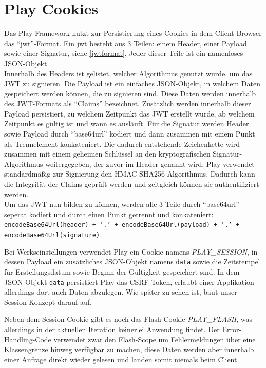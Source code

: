 \documentclass[12pt,DIV14,BCOR10mm,a4paper,parskip=half-,headsepline,headinclude,english,ngerman,bibliography=totocnumbered]{scrreprt}
\begin{document}
\section{Play Cookies}
\label{play:cookies}
Das Play Framework nutzt zur Persistierung eines Cookies in dem Client-Browser das \enquote{\gls{jwt}}-Format.
Ein \gls{jwt} besteht aus 3 Teilen: einem Header, einer Payload sowie einer Signatur, siehe \ref{jwtformat}.
Jeder dieser Teile ist ein namenloses JSON-Objekt. \\
Innerhalb des Headers ist gelistet, welcher Algorithmus genutzt wurde, um das JWT zu signieren.
Die Payload ist ein einfaches JSON-Objekt, in welchem Daten gespeichert werden können, die zu signieren sind.
Diese Daten werden innerhalb des JWT-Formats als \enquote{Claims} bezeichnet.
Zusätzlich werden innerhalb dieser Payload persistiert, zu welchem Zeitpunkt das JWT erstellt wurde, ab welchem Zeitpunkt es gültig ist und wann es ausläuft.
Für die Signatur werden Header sowie Payload durch \enquote{base64url} kodiert und dann zusammen mit einem Punkt als Trennelement konkateniert. Die dadurch entstehende Zeichenkette wird zusammen mit einem geheimen Schlüssel an den kryptografischen Signatur-Algorithmus weitergegeben, der zuvor im Header genannt wird.
Play verwendet standardmäßig zur Signierung den HMAC-SHA256 Algorithmus.
Dadurch kann die Integrität der Claims geprüft werden und zeitgleich können sie authentifiziert werden. \\
Um das JWT nun bilden zu können, werden alle 3 Teile durch \enquote{base64url} seperat kodiert und durch einen Punkt getrennt und konkateniert: \texttt{encodeBase64Url(header) + '.' + encodeBase64Url(payload) + '.' + encodeBase64Url(signature)}.
\par
Bei Werkseinstellungen verwendet Play ein Cookie namens \textit{PLAY\_SESSION}, in dessen Payload ein zusätzliches JSON-Objekt namens \texttt{data} sowie die Zeitstempel für Erstellungsdatum sowie Beginn der Gültigkeit gespeichert sind.
In dem JSON-Objekt \texttt{data} persistiert Play das CSRF-Token, erlaubt einer Applikation allerdings dort auch Daten abzulegen.
Wie später zu sehen ist, baut unser Session-Konzept darauf auf.

Neben dem Session Cookie gibt es noch das Flash Cookie \textit{PLAY\_FLASH}, was allerdings in der aktuellen Iteration keinerlei Anwendung findet. Der Error-Handling-Code verwendet zwar den Flash-Scope um Fehlermeldungen über eine Klassengrenze hinweg verfügbar zu machen, diese Daten werden aber innerhalb einer Anfrage direkt wieder gelesen und landen somit niemals beim Client.
\end{document}
